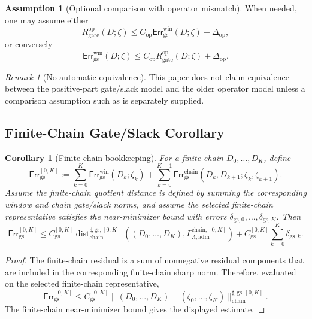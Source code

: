 \documentclass[11pt]{article}
\numberwithin{equation}{section}
\newtheorem{corollary}[corollary]{Corollary}
\theoremstyle{definition}
\newtheorem{assumption}[assumption]{Assumption}
\theoremstyle{remark}
\newtheorem{remark}[remark]{Remark}
\newcommand{\adm}{\mathrm{adm}}
\newcommand{\gs}{\mathrm{gs}}
\newcommand{\chain}{\mathrm{chain}}
\newcommand{\Err}{\mathsf{Err}}
\newcommand{\Dist}{\operatorname{dist}}
\begin{document}
\begin{assumption}[Optional comparison with operator mismatch]
\label{gs:ass:operator-comparison}
When needed, one may assume either
\[
    R_{\mathrm{gate}}^{\mathrm{op}}(D;\zeta)
    \le
    C_{\mathrm{op}}\Err_{\gs}^{\mathrm{win}}(D;\zeta)
    +
    \Delta_{\mathrm{op}},
\]
or conversely
\[
    \Err_{\gs}^{\mathrm{win}}(D;\zeta)
    \le
    C_{\mathrm{op}}R_{\mathrm{gate}}^{\mathrm{op}}(D;\zeta)
    +
    \Delta_{\mathrm{op}}.
\]
\end{assumption}

\begin{remark}[No automatic equivalence]
This paper does not claim equivalence between the positive-part
gate/slack model and the older operator model unless a comparison assumption
such as  is separately supplied.
\end{remark}

\subsection{Finite-Chain Gate/Slack Corollary}
\label{gs:sec:finite-chain}

\begin{corollary}[Finite-chain bookkeeping]
\label{gs:cor:finite-chain-gs-target}
For a finite chain \(D_0,\ldots,D_K\), define
\[
    \Err_{\gs}^{[0,K]}
    :=
    \sum_{k=0}^{K}
    \Err_{\gs}^{\mathrm{win}}(D_k;\zeta_k)
    +
    \sum_{k=0}^{K-1}
    \Err_{\gs}^{\chain}(D_k,D_{k+1};\zeta_k,\zeta_{k+1}).
\]
Assume the finite-chain quotient distance is defined by summing the
corresponding window and chain gate/slack norms, and assume the selected
finite-chain representative satisfies the near-minimizer bound with errors
\(\delta_{\gs,0},\ldots,\delta_{\gs,K}\).  Then
\[
    \Err_{\gs}^{[0,K]}
    \le
    C_{\gs}^{[0,K]}
    \Dist_{\chain}^{\sharp,\gs,[0,K]}
    ((D_0,\ldots,D_K),\Gamma_{\Lambda,\adm}^{\chain,[0,K]})
    +
    C_{\gs}^{[0,K]}\sum_{k=0}^K\delta_{\gs,k}.
\]
\end{corollary}

\begin{proof}
The finite-chain residual is a sum of nonnegative residual components that are
included in the corresponding finite-chain sharp norm.  Therefore, evaluated
on the selected finite-chain representative,
\[
    \Err_{\gs}^{[0,K]}
    \le
    C_{\gs}^{[0,K]}
    \|(D_0,\ldots,D_K)-(\zeta_0,\ldots,\zeta_K)\|_{\chain}^{\sharp,\gs,[0,K]}.
\]
The finite-chain near-minimizer bound gives the displayed estimate.
\end{proof}
\end{document}
